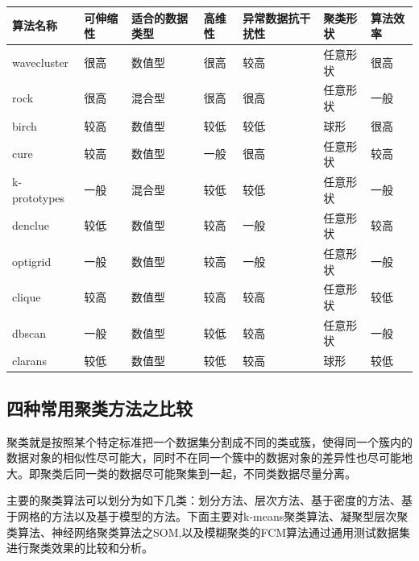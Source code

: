\begin{table}[h]
	\centering
	\begin{tabular}{|p{}|p{}|p{}|p{}|p{}|p{}|p{}|}\hline
   算法名称   & 可伸缩性 & 适合的数据类型 & 高维性 & 异常数据抗干扰性 & 聚类形状 & 算法效率\\\hline 
 {\scriptsize wavecluster } &   很高   &     数值型     &  很高  &       较高       & 任意形状 &   很高  \\\hline 
 {\scriptsize     rock    } &   很高   &     混合型     &  很高  &       很高       & 任意形状 &   一般  \\\hline 
 {\scriptsize    birch    } &   较高   &     数值型     &  较低  &       较低       &   球形   &   很高  \\\hline 
 {\scriptsize     cure    } &   较高   &     数值型     &  一般  &       很高       & 任意形状 &   较高  \\\hline 
 {\scriptsize k-prototypes} &   一般   &     混合型     &  较低  &       较低       & 任意形状 &   一般  \\\hline 
 {\scriptsize   denclue   } &   较低   &     数值型     &  较高  &       一般       & 任意形状 &   较高  \\\hline 
 {\scriptsize   optigrid  } &   一般   &     数值型     &  较高  &       一般       & 任意形状 &   一般  \\\hline 
 {\scriptsize    clique   } &   较高   &     数值型     &  较高  &       较高       & 任意形状 &   较低  \\\hline 
 {\scriptsize    dbscan   } &   一般   &     数值型     &  较低  &       较高       & 任意形状 &   一般  \\\hline 
 {\scriptsize   clarans   } &   较低   &     数值型     &  较低  &       较高       &   球形   &   较低  \\\hline 
	\end{tabular}
\end{table}

\subsection{四种常用聚类方法之比较}

聚类就是按照某个特定标准把一个数据集分割成不同的类或簇，使得同一个簇内的数据对象的相似性尽可能大，同时不在同一个簇中的数据对象的差异性也尽可能地大。即聚类后同一类的数据尽可能聚集到一起，不同类数据尽量分离。

主要的聚类算法可以划分为如下几类：划分方法、层次方法、基于密度的方法、基于网格的方法以及基于模型的方法。下面主要对k-means聚类算法、凝聚型层次聚类算法、神经网络聚类算法之SOM,以及模糊聚类的FCM算法通过通用测试数据集进行聚类效果的比较和分析。

